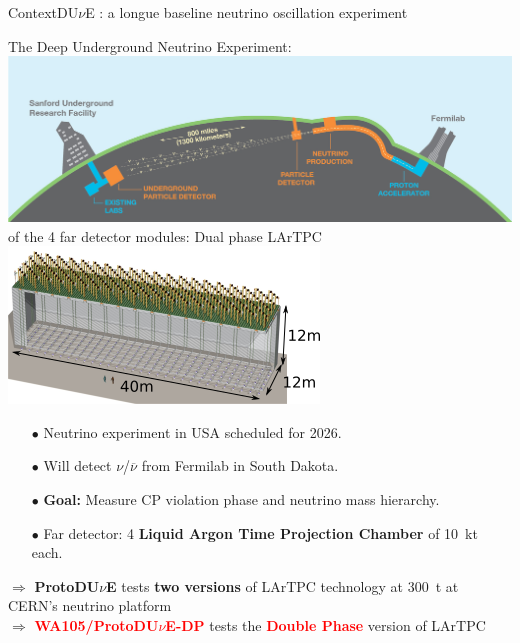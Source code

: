 \documentclass[10pt]{beamer}
\begin{document}
    \begin{frame}{Context}{DU$\nu$E : a longue baseline neutrino oscillation experiment}
    	\begin{scriptsize}
    	\begin{minipage}{0.58\textwidth}
    		\centering
    		The Deep Underground Neutrino Experiment:\\
    		\includegraphics[width=\textwidth]{figures/contexte/dune.jpg}\\
    		\vspace{0.5cm}
    		 of the 4 far detector modules: Dual phase LArTPC\\
    		\includegraphics[width=\textwidth]{figures/contexte/dune_module.png}\\
    	\end{minipage}
    	\hfill
    	\begin{minipage}{0.38\textwidth}
    		\begin{itemize}
    			\item[$\bullet$] Neutrino experiment in USA scheduled for 2026.
    			\item[$\bullet$] Will detect $\nu$/$\overline{\nu}$ from Fermilab in South Dakota.
    			\item[$\bullet$] \textbf{Goal: }Measure CP violation phase and neutrino mass hierarchy.
    			\item[$\bullet$] Far detector: 4 \textbf{Liquid Argon Time Projection Chamber} of \SI{10}{\kilo\tonne} each.
    		\end{itemize}
    		\vspace{.3cm}
    		$\Rightarrow$ \textbf{ProtoDU$\nu$E} tests \textbf{two versions} of LArTPC technology at \SI{300}{\tonne} at CERN's neutrino platform\\
    		
    		$\Rightarrow$ \textcolor{red}{\textbf{WA105/ProtoDU$\nu$E-DP}} tests the \textcolor{red}{\textbf{Double Phase}} version of LArTPC 
	    \end{minipage}
	\end{scriptsize}
    \end{frame}
    
\end{document}
